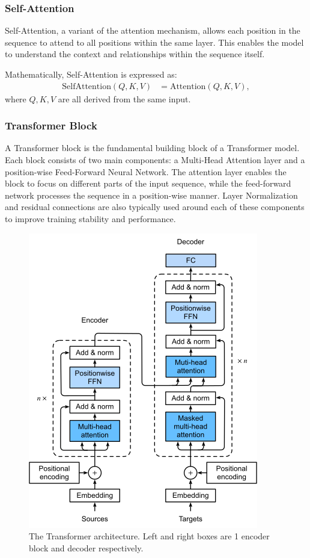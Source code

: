 \documentclass[10pt,twocolumn,letterpaper]{article}
\begin{document}
\subsubsection{Self-Attention}
\label{sec:self-attention}
Self-Attention\cite{vaswani2017attention}, a variant of the attention mechanism, allows each position in the sequence to attend to all positions within the same layer. This enables the model to understand the context and relationships within the sequence itself.

Mathematically, Self-Attention is expressed as:
\begin{align*}
    \text{SelfAttention}(Q, K, V) &= \text{Attention}(Q, K, V),
\end{align*}
where \( Q, K, V \) are all derived from the same input.
\subsubsection{Transformer Block}
\label{sec:transformer-block}
A Transformer block is the fundamental building block of a Transformer model. Each block consists of two main components: a Multi-Head Attention layer and a position-wise Feed-Forward Neural Network\cite{vaswani2017attention}. The attention layer enables the block to focus on different parts of the input sequence, while the feed-forward network processes the sequence in a position-wise manner. Layer Normalization and residual connections are also typically used around each of these components to improve training stability and performance.
\begin{figure}[h]
	\centering
	\includegraphics[width=0.7\columnwidth]{transformer}
	\caption{The Transformer architecture. Left and right boxes are 1 encoder block and decoder respectively\cite{zhang2023dive}.}
	\label{fig:trans}
\end{figure}
\end{document}

